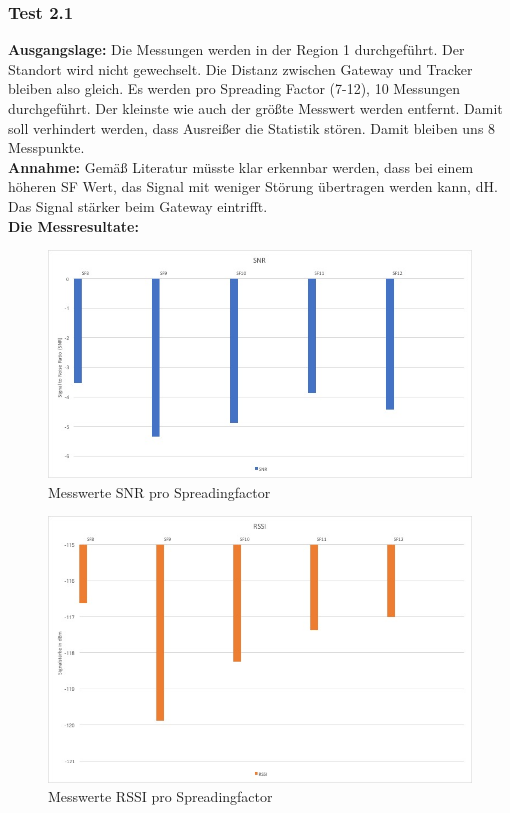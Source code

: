 \documentclass[11pt,english,german]{report}
\theoremstyle{definition}
\begin{document}
\subsubsection{Test 2.1}
\textbf{Ausgangslage:} Die Messungen werden in der Region 1 durchgeführt. Der Standort wird nicht gewechselt. Die Distanz zwischen Gateway und Tracker bleiben also gleich. Es werden pro Spreading Factor (7-12), 10 Messungen durchgeführt. Der kleinste wie auch der größte Messwert werden entfernt. Damit soll verhindert werden, dass Ausreißer die Statistik stören. Damit bleiben uns 8 Messpunkte. \\[0.3cm]
\textbf{Annahme:} Gemäß Literatur müsste klar erkennbar werden, dass bei einem höheren SF Wert, das Signal mit weniger Störung übertragen werden kann, dH. Das Signal stärker beim Gateway eintrifft.\\[0.3cm]
\textbf{Die Messresultate:}
\begin{figure}[H]
	\centering
		\includegraphics[width=\textwidth]{img/testing/testing1_sf_snr.jpg}
		\caption[Messwerte SNR  pro Spreadingfactor]
		{Messwerte SNR pro Spreadingfactor}
\end{figure}
\begin{figure}[H]
	\centering
	\includegraphics[width=\textwidth]{img/testing/testing1_sf_rssi.jpg}
	\caption[Messwerte RSSI pro Spreadingfactor]
	{Messwerte RSSI pro Spreadingfactor}
\end{figure}
\end{document}
